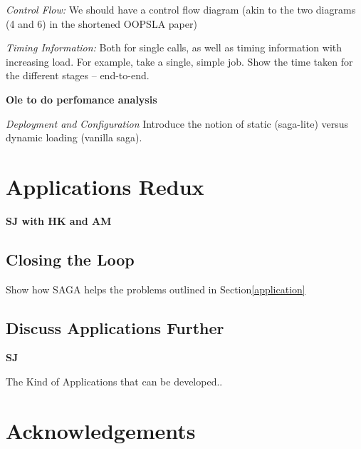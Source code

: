 \documentclass[10pt,letterpaper]{article}
\begin{document}
{\it Control Flow:} We should have a control flow diagram (akin to the
two diagrams (4 and 6) in the shortened OOPSLA paper)

{\it Timing Information:} Both for single calls, as well as timing
information with increasing load.  For example, take a single, simple
job. Show the time taken for the different stages -- end-to-end.

{\bf Ole to do perfomance analysis}

{\it Deployment and Configuration} Introduce the notion of static
(saga-lite) versus dynamic loading (vanilla saga).

\section{Applications Redux}{\bf SJ with HK and AM}

\subsection{Closing the Loop}

Show how SAGA helps the problems outlined in Section\ref{application}

\subsection{Discuss Applications Further} {\bf SJ}
 
The Kind of Applications that can be developed..

\section*{Acknowledgements}

%


\end{document}
